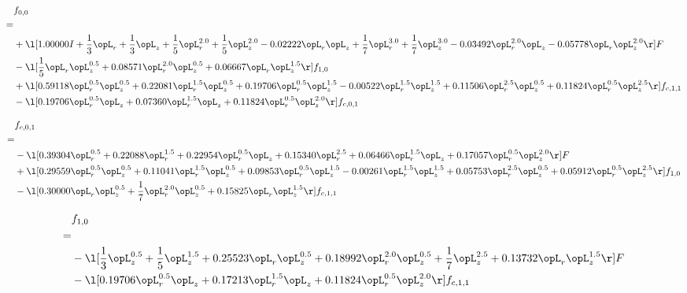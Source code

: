 \begin{alignat}{2} 
\label{eq:f_00_2} 
& f_{0,0} \nonumber \\ 
 = \\ 
& + \l[  1.00000 I + \frac{1}{3} \opL_r + \frac{1}{3} \opL_z + \frac{1}{5} \opL_r^{2.0} + \frac{1}{5} \opL_z^{2.0}   -0.02222 \opL_r \opL_z + \frac{1}{7} \opL_r^{3.0} + \frac{1}{7} \opL_z^{3.0}   -0.03492 \opL_r^{2.0} \opL_z   -0.05778 \opL_r \opL_z^{2.0}  \r] F \nonumber \\ 
& - \l[ \frac{1}{5} \opL_r \opL_z^{0.5} +  0.08571 \opL_r^{2.0} \opL_z^{0.5} +  0.06667 \opL_r \opL_z^{1.5}  \r] f_{1,0} \nonumber \\ 
& + \l[  0.59118 \opL_r^{0.5} \opL_z^{0.5} +  0.22081 \opL_r^{1.5} \opL_z^{0.5} +  0.19706 \opL_r^{0.5} \opL_z^{1.5}   -0.00522 \opL_r^{1.5} \opL_z^{1.5} +  0.11506 \opL_r^{2.5} \opL_z^{0.5} +  0.11824 \opL_r^{0.5} \opL_z^{2.5}  \r] f_{c,1,1} \nonumber \\ 
& - \l[  0.19706 \opL_r^{0.5} \opL_z +  0.07360 \opL_r^{1.5} \opL_z +  0.11824 \opL_r^{0.5} \opL_z^{2.0}  \r] f_{c,0,1} \nonumber \\ 
\end{alignat} 


\begin{alignat}{2} 
\label{eq:f_01_2} 
& f_{c,0,1} \nonumber \\ 
 = \\ 
& - \l[  0.39304 \opL_r^{0.5} +  0.22088 \opL_r^{1.5} +  0.22954 \opL_r^{0.5} \opL_z +  0.15340 \opL_r^{2.5} +  0.06466 \opL_r^{1.5} \opL_z +  0.17057 \opL_r^{0.5} \opL_z^{2.0}  \r] F \nonumber \\ 
& + \l[  0.29559 \opL_r^{0.5} \opL_z^{0.5} +  0.11041 \opL_r^{1.5} \opL_z^{0.5} +  0.09853 \opL_r^{0.5} \opL_z^{1.5}   -0.00261 \opL_r^{1.5} \opL_z^{1.5} +  0.05753 \opL_r^{2.5} \opL_z^{0.5} +  0.05912 \opL_r^{0.5} \opL_z^{2.5}  \r] f_{1,0} \nonumber \\ 
& - \l[  0.30000 \opL_r \opL_z^{0.5} + \frac{1}{7} \opL_r^{2.0} \opL_z^{0.5} +  0.15825 \opL_r \opL_z^{1.5}  \r] f_{c,1,1} \nonumber \\ 
\end{alignat} 


\begin{alignat}{2} 
\label{eq:f_10_2} 
& f_{1,0} \nonumber \\ 
 = \\ 
& - \l[ \frac{1}{3} \opL_z^{0.5} + \frac{1}{5} \opL_z^{1.5} +  0.25523 \opL_r \opL_z^{0.5} +  0.18992 \opL_r^{2.0} \opL_z^{0.5} + \frac{1}{7} \opL_z^{2.5} +  0.13732 \opL_r \opL_z^{1.5}  \r] F \nonumber \\ 
& - \l[  0.19706 \opL_r^{0.5} \opL_z +  0.17213 \opL_r^{1.5} \opL_z +  0.11824 \opL_r^{0.5} \opL_z^{2.0}  \r] f_{c,1,1} \nonumber \\ 
\end{alignat} 


